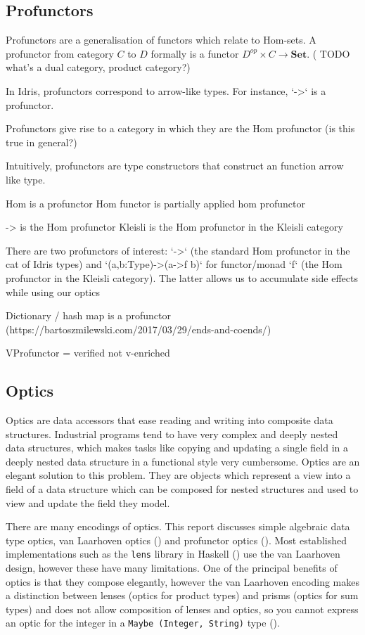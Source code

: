 \documentclass[]{report}
\begin{document}
\subsection{Profunctors}

Profunctors are a generalisation of functors which relate to Hom-sets. A profunctor from category $C$ to $D$ formally is a functor $D^{op}\times C\to\mathbf{Set}$. ( TODO what's a dual category, product category?)

In Idris, profunctors correspond to arrow-like types. For instance, `->` is a profunctor. 

Profunctors give rise to a category in which they are the Hom profunctor (is this true in general?)

Intuitively, profunctors are type constructors that construct an function arrow like type.

Hom is a profunctor
Hom functor is partially applied hom profunctor

-> is the Hom profunctor
Kleisli is the Hom profunctor in the Kleisli category

There are two profunctors of interest: `->` (the standard Hom profunctor in the cat of Idris types) and `(a,b:Type)->(a->f b)` for functor/monad `f` (the Hom profunctor in the Kleisli category). The latter allows us to accumulate side effects while using our optics

Dictionary / hash map is a profunctor (https://bartoszmilewski.com/2017/03/29/ends-and-coends/)

VProfunctor = verified not v-enriched

\subsection{Optics}

Optics are data accessors that ease reading and writing into composite data structures. Industrial programs tend to have very complex and deeply nested data structures, which makes tasks like copying and updating a single field in a deeply nested data structure in a functional style very cumbersome. Optics are an elegant solution to this problem. They are objects which represent a view into a field of a data structure which can be composed for nested structures and used to view and update the field they model.

There are many encodings of optics. This report discusses simple algebraic data type optics, van Laarhoven optics (\cite{laarhoven2011lens}) and profunctor optics (\cite{pickering2017profunctor}). Most established implementations such as the \texttt{lens} library in Haskell (\cite{ekmettlens}) use the van Laarhoven design, however these have many limitations. One of the principal benefits of optics is that they compose elegantly, however the van Laarhoven encoding makes a distinction between lenses (optics for product types) and prisms (optics for sum types) and does not allow composition of lenses and optics, so you cannot express an optic for the integer in a \texttt{Maybe (Integer, String)} type (\cite{pickering2017profunctor}).
\end{document}
